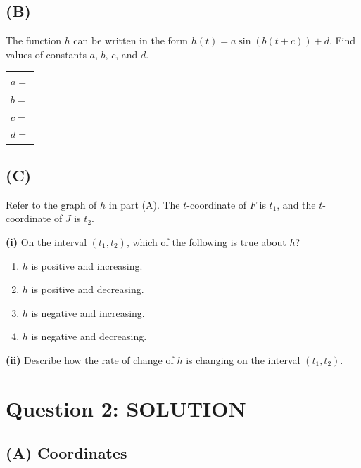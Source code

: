 \documentclass[11pt]{article}
\begin{document}
\subsection*{(B)}
The function $h$ can be written in the form $h(t) = a \sin(b(t + c)) + d$. Find values of constants $a$, $b$, $c$, and $d$.

\begin{center}
\begin{tabular}{|l|}
\hline
$a = $ \underline{\hspace{3cm}} \\[10pt]
\hline
$b = $ \underline{\hspace{3cm}} \\[10pt]
\hline
$c = $ \underline{\hspace{3cm}} \\[10pt]
\hline
$d = $ \underline{\hspace{3cm}} \\[10pt]
\hline
\end{tabular}
\end{center}

\subsection*{(C)}
Refer to the graph of $h$ in part (A). The $t$-coordinate of $F$ is $t_1$, and the $t$-coordinate of $J$ is $t_2$.

\textbf{(i)} On the interval $(t_1, t_2)$, which of the following is true about $h$?

\begin{enumerate}[label=\alph*., leftmargin=1.5cm]
    \item $h$ is positive and increasing.
    \item $h$ is positive and decreasing.
    \item $h$ is negative and increasing.
    \item $h$ is negative and decreasing.
\end{enumerate}

\vspace{0.5cm}
\textbf{(ii)} Describe how the rate of change of $h$ is changing on the interval $(t_1, t_2)$.

\newpage

\section*{Question 2: SOLUTION}

\subsection*{(A) Coordinates}
\end{document}
